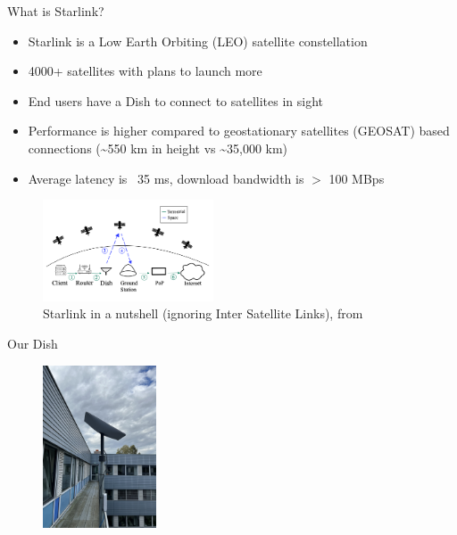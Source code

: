 \documentclass[NET,english,beameralt]{tumbeamer}
\begin{document}
\begin{frame}{What is Starlink?}
    \begin{itemize}
        \item Starlink is a Low Earth Orbiting (LEO) satellite constellation
        \item 4000+ satellites with plans to launch more
        \item End users have a Dish to connect to satellites in sight
        \item Performance is higher compared to geostationary satellites (GEOSAT) based connections (\textasciitilde 550
              km in height vs \textasciitilde 35,000 km)
        \item Average latency is ~35 ms, download bandwidth is $>$ 100 MBps
    \end{itemize}

    \begin{figure}
        \includegraphics[width=0.45\textwidth]{pics/starlink-101.png}
        \caption{Starlink in a nutshell (ignoring Inter Satellite Links), from \cite{izhikevich2023democratizing}}
    \end{figure}
\end{frame}

\begin{frame}{Our Dish}
    \begin{figure}
        \includegraphics[width=0.3\textwidth]{pics/dish.jpeg}
    \end{figure}
\end{frame}
\end{document}
